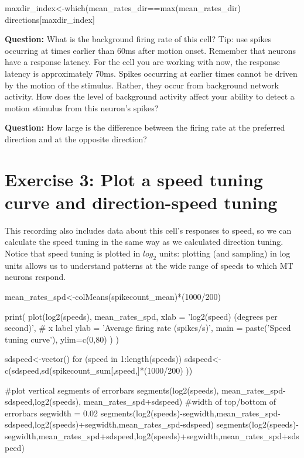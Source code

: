 \documentclass[
letterpaper, %
11pt, %
 oneside, 
onecolumn, %
]{memoir}
\numberwithin{Exercise}{chapter}
\begin{document}
\begin{shortrcode}
maxdir_index<-which(mean_rates_dir==max(mean_rates_dir)
directions[maxdir_index]
\end{shortrcode}   

\textbf{Question:} What is the background firing rate of this cell?  Tip: use spikes occurring at times earlier than 60ms after motion onset. Remember that neurons have a response latency. For the cell you are working with now, the response latency is approximately 70ms. Spikes occurring at earlier times cannot be driven by the motion of the stimulus. Rather, they occur from background network activity. How does the level of background activity affect your ability to detect a motion stimulus from this neuron's spikes? \newline

\textbf{Question:} How large is the difference between the firing rate at the preferred direction and at the opposite direction? 

\section{Exercise 3:  Plot a speed tuning curve and direction-speed tuning}    

This recording also includes data about this cell's responses to speed, so we can calculate the speed tuning in the same way as we calculated direction tuning.  Notice that speed tuning is plotted in $log_2$ units: plotting (and sampling) in log units allows us to understand patterns at the wide range of speeds to which MT neurons respond. 

\begin{shortrcode}
mean_rates_spd<-colMeans(spikecount_mean)*(1000/200)

print(
  plot(log2(speeds),
       mean_rates_spd,
       xlab = 'log2(speed) (degrees per second)', # x label
       ylab = 'Average firing rate (spikes/s)',
       main = paste('Speed tuning curve'),
       ylim=c(0,80)
  )
)

sdspeed<-vector()
for (speed in 1:length(speeds)){
  sdspeed<-c(sdspeed,sd(spikecount_sum[,speed,]*(1000/200) ))
}

#plot vertical segments of errorbars
segments(log2(speeds), mean_rates_spd-sdspeed,log2(speeds), mean_rates_spd+sdspeed)
#width of top/bottom of errorbars
segwidth = 0.02
segments(log2(speeds)-segwidth,mean_rates_spd-sdspeed,log2(speeds)+segwidth,mean_rates_spd-sdspeed)
segments(log2(speeds)-segwidth,mean_rates_spd+sdspeed,log2(speeds)+segwidth,mean_rates_spd+sdspeed)
\end{shortrcode}   
\end{document}

